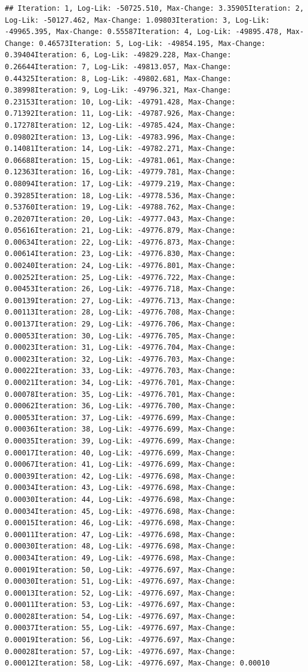 \documentclass[
]{book}
\begin{document}
\begin{verbatim}
## Iteration: 1, Log-Lik: -50725.510, Max-Change: 3.35905Iteration: 2, Log-Lik: -50127.462, Max-Change: 1.09803Iteration: 3, Log-Lik: -49965.395, Max-Change: 0.55587Iteration: 4, Log-Lik: -49895.478, Max-Change: 0.46573Iteration: 5, Log-Lik: -49854.195, Max-Change: 0.39404Iteration: 6, Log-Lik: -49829.228, Max-Change: 0.26644Iteration: 7, Log-Lik: -49813.057, Max-Change: 0.44325Iteration: 8, Log-Lik: -49802.681, Max-Change: 0.38998Iteration: 9, Log-Lik: -49796.321, Max-Change: 0.23153Iteration: 10, Log-Lik: -49791.428, Max-Change: 0.71392Iteration: 11, Log-Lik: -49787.926, Max-Change: 0.17278Iteration: 12, Log-Lik: -49785.424, Max-Change: 0.09802Iteration: 13, Log-Lik: -49783.996, Max-Change: 0.14081Iteration: 14, Log-Lik: -49782.271, Max-Change: 0.06688Iteration: 15, Log-Lik: -49781.061, Max-Change: 0.12363Iteration: 16, Log-Lik: -49779.781, Max-Change: 0.08094Iteration: 17, Log-Lik: -49779.219, Max-Change: 0.39285Iteration: 18, Log-Lik: -49778.536, Max-Change: 0.53760Iteration: 19, Log-Lik: -49788.762, Max-Change: 0.20207Iteration: 20, Log-Lik: -49777.043, Max-Change: 0.05616Iteration: 21, Log-Lik: -49776.879, Max-Change: 0.00634Iteration: 22, Log-Lik: -49776.873, Max-Change: 0.00614Iteration: 23, Log-Lik: -49776.830, Max-Change: 0.00240Iteration: 24, Log-Lik: -49776.801, Max-Change: 0.00252Iteration: 25, Log-Lik: -49776.722, Max-Change: 0.00453Iteration: 26, Log-Lik: -49776.718, Max-Change: 0.00139Iteration: 27, Log-Lik: -49776.713, Max-Change: 0.00113Iteration: 28, Log-Lik: -49776.708, Max-Change: 0.00137Iteration: 29, Log-Lik: -49776.706, Max-Change: 0.00053Iteration: 30, Log-Lik: -49776.705, Max-Change: 0.00023Iteration: 31, Log-Lik: -49776.704, Max-Change: 0.00023Iteration: 32, Log-Lik: -49776.703, Max-Change: 0.00022Iteration: 33, Log-Lik: -49776.703, Max-Change: 0.00021Iteration: 34, Log-Lik: -49776.701, Max-Change: 0.00078Iteration: 35, Log-Lik: -49776.701, Max-Change: 0.00062Iteration: 36, Log-Lik: -49776.700, Max-Change: 0.00053Iteration: 37, Log-Lik: -49776.699, Max-Change: 0.00036Iteration: 38, Log-Lik: -49776.699, Max-Change: 0.00035Iteration: 39, Log-Lik: -49776.699, Max-Change: 0.00017Iteration: 40, Log-Lik: -49776.699, Max-Change: 0.00067Iteration: 41, Log-Lik: -49776.699, Max-Change: 0.00039Iteration: 42, Log-Lik: -49776.698, Max-Change: 0.00034Iteration: 43, Log-Lik: -49776.698, Max-Change: 0.00030Iteration: 44, Log-Lik: -49776.698, Max-Change: 0.00034Iteration: 45, Log-Lik: -49776.698, Max-Change: 0.00015Iteration: 46, Log-Lik: -49776.698, Max-Change: 0.00011Iteration: 47, Log-Lik: -49776.698, Max-Change: 0.00030Iteration: 48, Log-Lik: -49776.698, Max-Change: 0.00034Iteration: 49, Log-Lik: -49776.698, Max-Change: 0.00019Iteration: 50, Log-Lik: -49776.697, Max-Change: 0.00030Iteration: 51, Log-Lik: -49776.697, Max-Change: 0.00013Iteration: 52, Log-Lik: -49776.697, Max-Change: 0.00011Iteration: 53, Log-Lik: -49776.697, Max-Change: 0.00028Iteration: 54, Log-Lik: -49776.697, Max-Change: 0.00037Iteration: 55, Log-Lik: -49776.697, Max-Change: 0.00019Iteration: 56, Log-Lik: -49776.697, Max-Change: 0.00028Iteration: 57, Log-Lik: -49776.697, Max-Change: 0.00012Iteration: 58, Log-Lik: -49776.697, Max-Change: 0.00010
\end{verbatim}
\end{document}
